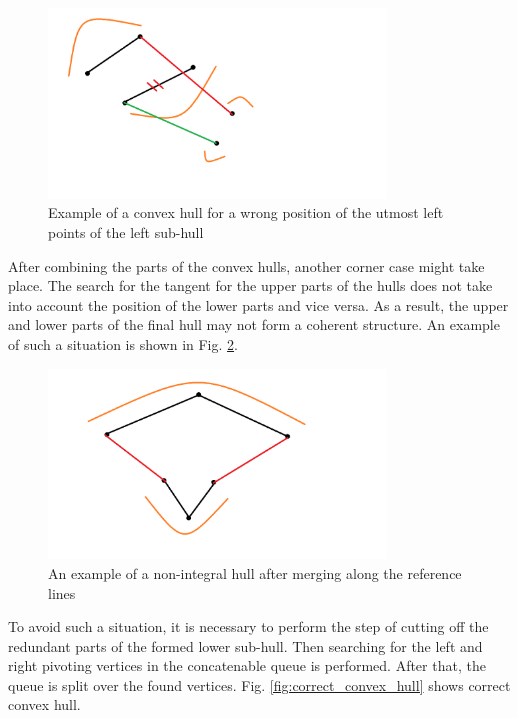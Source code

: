 \documentclass[a4paper,UKenglish,cleveref, autoref]{socg-lipics-v2019}
\begin{document}
	
	\begin{figure}[t]
		\centering
		\includegraphics[width=0.8\textwidth, height=0.3\textheight]{incorect_edge_points}
		\caption{Example of a convex hull for a wrong position of the utmost left points of the left sub-hull}
		\label{fig:incorect_edge_points}
	\end{figure}
	
	After combining the parts of the convex hulls, another corner case might take place. The search for the tangent for the upper parts of the hulls does not take into account the position of the lower parts and vice versa. As a result, the upper and lower parts of the final hull may not form a coherent structure. An example of such a situation is shown in Fig. \ref{fig:incorect_lower_subhull}.
	
	\begin{figure}[t]
		\centering
		\includegraphics[width=0.8\textwidth, height=0.3\textheight]{incorect_lower_subhull}
		\caption{An example of a non-integral hull after merging along the reference lines}
		\label{fig:incorect_lower_subhull}
	\end{figure}
	
	To avoid such a situation, it is necessary to perform the step of cutting off the redundant parts of the formed lower sub-hull. Then searching for the left and right pivoting vertices in the concatenable queue is performed. After that, the queue is split over the found vertices. Fig. \ref{fig:correct_convex_hull} shows correct convex hull.
	
\end{document}
